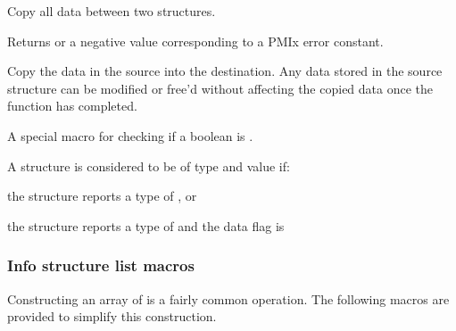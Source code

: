 
\summary

Copy all data between two  structures.

\format


\begin{arglist}
\end{arglist}

Returns  or a negative value corresponding to a PMIx error constant.

\descr

Copy the data in the source  into the destination. Any data stored in the source structure can be modified or free'd without affecting the copied data once the function has completed.


A special macro for checking if a boolean  is .


\begin{arglist}
\end{arglist}

A  structure is considered to be of type  and value  if:

\begin{compactitemize}
    \item the structure reports a type of , or
    \item the structure reports a type of  and the data flag is 
\end{compactitemize}

\subsubsection{Info structure list macros}
Constructing an array of  is a fairly common operation. The following macros are provided to simplify this construction.

